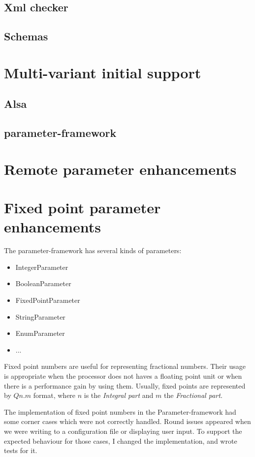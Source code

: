 \subsection{Xml checker}
\subsection{Schemas}

\section{Multi-variant initial support}
\subsection{Alsa}
\subsection{parameter-framework}

\section{Remote parameter enhancements}

\section{Fixed point parameter enhancements}
The parameter-framework has several kinds of parameters:
\begin{itemize}
    \item IntegerParameter
    \item BooleanParameter
    \item FixedPointParameter
    \item StringParameter
    \item EnumParameter
    \item ...
\end{itemize}

Fixed point numbers are useful for representing fractional numbers. Their
usage is appropriate when the processor does not haves a floating point unit
or when there is a performance gain by using them. Usually, fixed points are
represented by $Qn.m$ format, where $n$ is the \emph{Integral part} and $m$ the
\emph{Fractional part}.

The implementation of fixed point numbers in the Parameter-framework had some
corner cases which were not correctly handled. Round issues appeared when we
were writing to a configuration file or displaying user input. To
support the expected behaviour for those cases, I changed the implementation, and
wrote tests for it.

